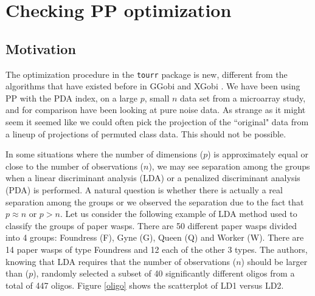 \documentclass[12]{report}
\begin{document}
%
%
%
%
%
%

\section{Checking PP optimization} \label{sec:largep}

\subsection{Motivation}

The optimization procedure in the  \texttt{tourr} package is new, different from the algorithms that have existed before in GGobi \cite{STLBC03} and XGobi \cite{SCB91}. 
We have been using PP with the PDA index, on a large $p$, small $n$ data set from a microarray study, and for comparison have been looking at pure noise data. As strange as it might seem it seemed like we could often pick the projection of the  ``original" data from a lineup of projections of permuted class data. This should not be possible. 

In some situations where the number of dimensions ($p$) is approximately equal or close to the number of observations ($n$), we may see separation among the groups when a linear discriminant analysis (LDA) or a penalized discriminant analysis (PDA) is performed. A natural question is whether there is actually a real separation among the groups or we observed the separation due to the fact that $p \approx n$ or $p > n$. Let us consider the following example of LDA method used to classify the groups of paper wasps. There are 50 different paper wasps divided into 4 groups: Foundress (F), Gyne (G), Queen (Q) and Worker (W). There are 14 paper wasps of type Foundress and 12 each of the other 3 types. The authors, knowing that LDA requires that the number of observations ($n$) should be larger than ($p$), randomly selected a subset of 40 significantly different oligos from a total of 447 oligos. Figure \ref{oligo} shows the scatterplot of LD1 versus LD2.
\end{document}
